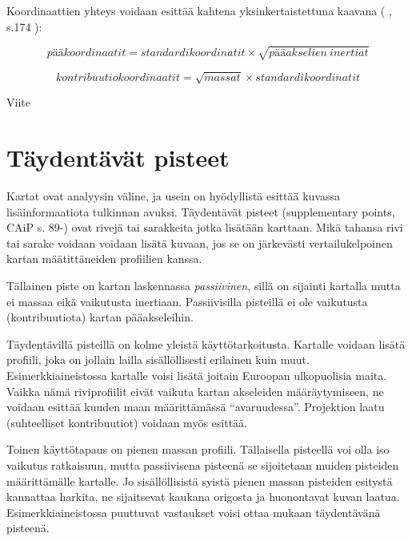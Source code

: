 \documentclass[
  finnish,
]{book}
\begin{document}
Koordinaattien yhteys voidaan esittää kahtena yksinkertaistettuna kaavana
( \citet{RefWorks:doc:5b8175eee4b08da192f99a35}, s.174 ):

\begin{equation}
  pääkoordinaatit = standardikoordinatit \times \sqrt{pääakselien \: inertiat}
    \label{eq:pcfromstd1}
\end{equation}

\begin{equation}
  kontribuutiokoordinaatit = \sqrt{massat} \times  standardikoordinatit 
    \label{eq:kontribfromstd1}
\end{equation}

Viite

\hypertarget{tuxe4ydentuxe4vuxe4t-pisteet}{%
\chapter{Täydentävät pisteet}\label{tuxe4ydentuxe4vuxe4t-pisteet}}

Kartat ovat analyysin väline, ja usein on hyödyllistä esittää kuvassa
lisäinformaatiota tulkinnan avuksi. Täydentävät pisteet (supplementary points,
CAiP s. 89-) ovat rivejä tai sarakkeita jotka lisätään karttaan. Mikä tahansa
rivi tai sarake voidaan voidaan lisätä kuvaan, jos se on järkevästi vertailukelpoinen
kartan määtittäneiden profiilien kanssa.

Tällainen piste on kartan laskennassa \emph{passiivinen}, sillä on sijainti kartalla
mutta ei massaa eikä vaikutusta inertiaan. Passiivisilla pisteillä ei ole vaikutusta
(kontribuutiota) kartan pääakseleihin.

Täydentävillä pisteillä on kolme yleistä käyttötarkoitusta. Kartalle voidaan lisätä
profiili, joka on jollain lailla sisällöllisesti erilainen kuin muut. Esimerkkiaineistossa
kartalle voisi lisätä joitain Euroopan ulkopuolisia maita. Vaikka nämä riviprofiilit
eivät vaikuta kartan akseleiden määräytymiseen, ne voidaan esittää kuuden maan
määrittämässä ``avaruudessa''. Projektion laatu (suhteelliset kontribuutiot) voidaan myös
esittää.

Toinen käyttötapaus on pienen massan profiili. Tällaisella pisteellä voi olla iso
vaikutus ratkaisuun, mutta passiivisena pisteenä se sijoitetaan muiden pisteiden
määrittämälle kartalle. Jo sisällöllisistä syistä pienen massan pisteiden esitystä
kannattaa harkita, ne sijaitsevat kaukana origosta ja huonontavat kuvan laatua.
Esimerkkiaineistossa puuttuvat vastaukset voisi ottaa mukaan täydentävänä pisteenä.
\end{document}
